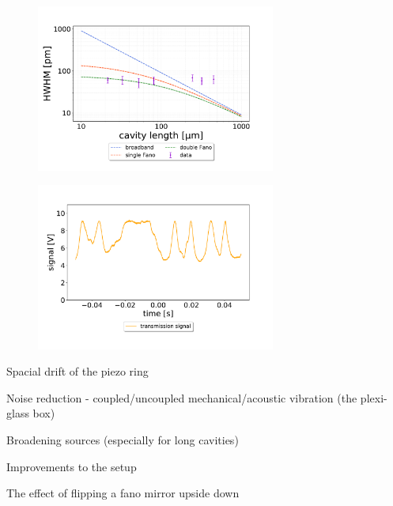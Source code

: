 \begin{figure}[h!]
    \centering
    \includegraphics[width=0.7\textwidth]{figures/results/double fano fits/HWHM_vs_cavity_length_result_2nd_measurement_only.pdf}
    \caption{}
    \label{fig:HWHM_vs_l_double_fano_result_2nd}
\end{figure}

\begin{figure}[h!]
    \centering
    \includegraphics[width=0.7\textwidth]{figures/results/noise_on_resonance.pdf}
    \caption{}
    \label{fig:noise_on_resonance}
\end{figure}

Spacial drift of the piezo ring

Noise reduction - coupled/uncoupled mechanical/acoustic vibration (the plexi-glass box)

Broadening sources (especially for long cavities)

Improvements to the setup

The effect of flipping a fano mirror upside down

